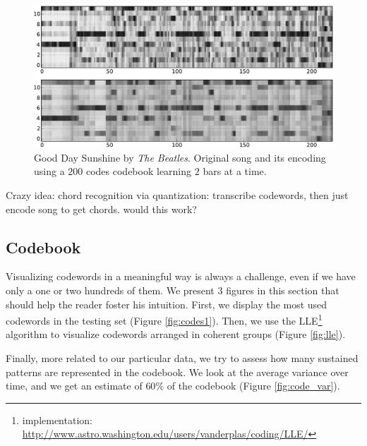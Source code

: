 \documentclass{article}
\begin{document}
\begin{figure}[htb]
\begin{center}
\includegraphics[width=.9\columnwidth]{song_encoded}
\end{center}
\caption{\small{Good Day Sunshine by \textit{The Beatles}.
Original song and its encoding using a $200$ codes codebook learning
$2$ bars at a time.
}}
\label{fig:encodesong}
\end{figure}

Crazy idea: chord recognition via quantization: transcribe codewords,
then just encode song to get chords. would this work?

\subsection{Codebook}
Visualizing codewords in a meaningful way is always a challenge, 
even if we have only a one or two hundreds of them.
We present $3$ figures in this section that should help the reader
foster his intuition. First, we display the most used codewords in
the testing set (Figure \ref{fig:codes1}). Then, we use the
 LLE\footnote{implementation: 
\url{http://www.astro.washington.edu/users/vanderplas/coding/LLE/}} 
algorithm \cite{Roweis2000} to visualize codewords arranged in
coherent groups (Figure \ref{fig:lle}). 

Finally, more related to our particular data, we try to assess how many
sustained patterns are represented in the codebook. We look at
the average variance over time, and we get an estimate of $60\%$ of the
codebook (Figure \ref{fig:code_var}).
\end{document}
